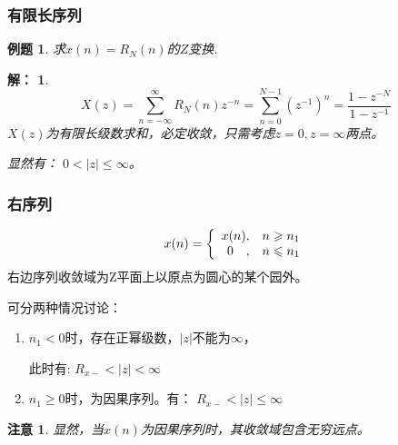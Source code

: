 \documentclass[notheorems,compress,mathserif,table]{beamer}
\newtheorem{example}{例题}
\newtheorem{answer}{解：}
\newtheorem{zhuyi}{注意}
\begin{document}
\begin{frame}[shrink]\frametitle{有限长序列}%
\begin{example}
求$x(n)=R_{N}(n)$的$Z$变换.\end{example}
\begin{answer}
$$X(z)= \sum_{n=-\infty}^{\infty}R_{N}(n)z^{-n} = \sum_{n=0}^{N-1}(z^{-1})^{n} = \frac{1-z^{-N}}{1-z^{-1}}$$
$X(z)$为有限长级数求和，必定收敛，只需考虑$z=0,z=\infty$两点。\par
显然有： \quad\quad\quad $0<|z|\leqslant \infty$。
\end{answer}
\end{frame}


\begin{frame}[shrink]\frametitle{右序列}%

\begin{equation*}
x(n) = \left\{
\begin{array}
{r@{,\quad}l}
x(n)    & n \geqslant n_1 \\
0\quad  & n \leqslant n_1
\end{array} \right.
\end{equation*}
右边序列收敛域为Z平面上以原点为圆心的某个园外。\par
可分两种情况讨论：
\begin{enumerate}
\item $n_1<0$时，存在正幂级数，$|z|$不能为$\infty$，\par 此时有: $R_{x-} <|z| <\infty$
\item $n_1\geqslant0$时，为因果序列。有： \quad $R_{x-} <|z| \leqslant\infty$
\end{enumerate}
\begin{zhuyi}
显然，当$x(n)$为因果序列时，其收敛域包含无穷远点。
\end{zhuyi}
\end{frame}
\end{document}
